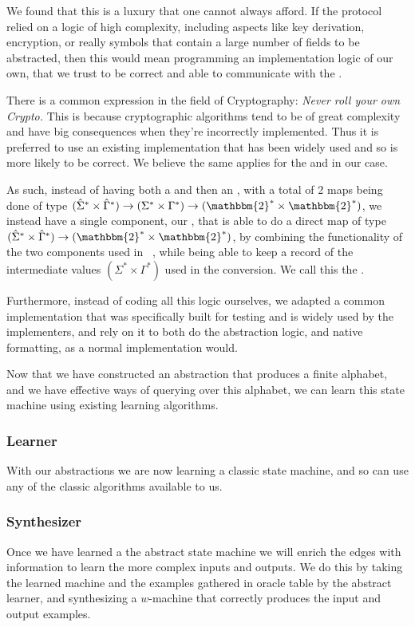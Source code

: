 We found that this is a luxury that one cannot always afford. If the protocol relied on a logic of high complexity, including aspects like key derivation, encryption, or really symbols that contain a large number of fields to be abstracted, then this would mean programming an implementation logic of our own, that we trust to be correct and able to communicate with the \sul. 

There is a common expression in the field of Cryptography: \textit{Never roll your own Crypto.} This is because cryptographic algorithms tend to be of great complexity and have big consequences when they're incorrectly implemented. Thus it is preferred to use an existing implementation that has been widely used and so is more likely to be correct. We believe the same applies for the \mapper and \adapter in our case. 

As such, instead of having both a \mapper and then an \adapter, with a total of 2 maps being done of type $(\hat\Sigma^* \times \hat\Gamma^*) \to (\Sigma^* \times \Gamma^*) \to (\mathbbm{2}^* \times \mathbbm{2}^*)$, we instead have a single component, our \adapter, that is able to do a direct map of type $(\hat\Sigma^* \times \hat\Gamma^*) \to (\mathbbm{2}^* \times \mathbbm{2}^*)$, by combining the functionality of the two components used in ~\cite{tcp-learner}, while being able to keep a record of the intermediate values $(\Sigma^* \times \Gamma^*)$ used in the conversion. We call this the \at.

Furthermore, instead of coding all this logic ourselves, we adapted a common implementation that was specifically built for testing and is widely used by the implementers, and rely on it to both do the abstraction logic, and native formatting, as a normal implementation would. 

Now that we have constructed an abstraction that produces a finite alphabet, and we have effective ways of querying over this alphabet, we can learn this state machine using existing learning algorithms.

\subsubsection{Learner}
With our abstractions we are now learning a classic state machine, and so can use any of the classic algorithms available to us.

\subsubsection{Synthesizer}
Once we have learned a the abstract state machine we will enrich the edges with information to learn the more complex inputs and outputs. We do this by taking the learned machine and the examples gathered in oracle table by the abstract learner, 
and synthesizing a $w$-machine that correctly produces the input and output examples.

